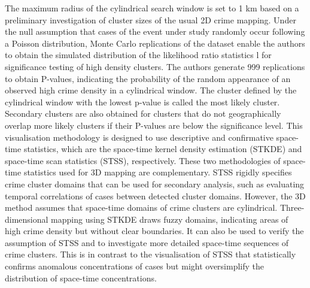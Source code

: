 \documentclass{sigkddExp}
\begin{document}
The maximum radius of the cylindrical search window is set to 1 km based on a preliminary investigation of cluster sizes of the usual 2D crime mapping. Under the null assumption that cases of the event under study randomly occur following a Poisson distribution, Monte Carlo replications of the dataset enable the authors to obtain the simulated distribution of the likelihood ratio statistics l for significance testing of high density clusters. The authors generate 999 replications to obtain P-values, indicating the probability of the random appearance of an observed high crime density in a cylindrical window. The cluster defined by the cylindrical window with the lowest p-value is called the most likely cluster. Secondary clusters are also obtained for clusters that do not geographically overlap more likely clusters if their P-values are below the significance level. This visualisation methodology is designed to use descriptive and confirmative space-time statistics, which are the space-time kernel density estimation (STKDE) and space-time scan statistics (STSS), respectively. These two methodologies of space-time statistics used for 3D mapping are complementary. STSS rigidly specifies crime cluster domains that can be used for secondary analysis, such as evaluating temporal correlations of cases between detected cluster domains. However, the 3D method assumes that space-time domains of crime clusters are cylindrical. Three-dimensional mapping using STKDE draws fuzzy domains, indicating areas of high crime density but without clear boundaries. It can also be used to verify the assumption of STSS and to investigate more detailed space-time sequences of crime clusters. This is in contrast to the visualisation of STSS that statistically confirms anomalous concentrations of cases but might oversimplify the distribution of space-time concentrations.
\end{document}
